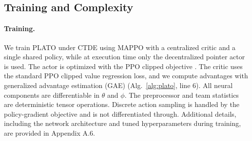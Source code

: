 



\subsection{Training and Complexity}\label{training}

\paragraph{Training.} 

We train PLATO under CTDE using MAPPO \cite{mappo,ppo} with a centralized critic and a single shared policy, while at execution time only the decentralized pointer actor is used. The actor is optimized with the PPO clipped objective \cite{ppo}. The critic uses the standard PPO clipped value regression loss, and we compute advantages with generalized advantage estimation (GAE) \cite{ppo,mappo,gae} (Alg.~\ref{alg:plato}, line 6). All neural components are differentiable in $\theta$ and $\phi$. The preprocessor and team statistics are deterministic tensor operations. Discrete action sampling is handled by the policy-gradient objective and is not differentiated through.  Additional details, including the network architecture and tuned hyperparameters during training, are provided in Appendix A.6. 

